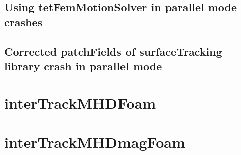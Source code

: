 \documentclass{scrbook}
\begin{document}
          \FloatBarrier

      \subsection{Using tetFemMotionSolver in parallel mode crashes}

      \subsection{Corrected patchFields of surfaceTracking library crash in parallel mode}

    \section{interTrackMHDFoam}

    \section{interTrackMHDmagFoam}

  \appendix
\end{document}
